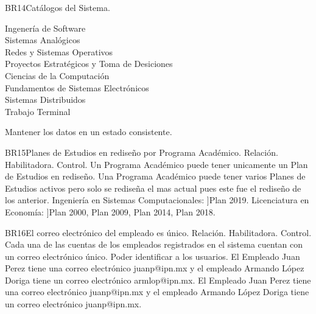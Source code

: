 \begin{BussinesRule}{BR14}{Catálogos del Sistema.}
\begin{itemize}
            Ingenería de Software\\
            Sistemas Analógicos\\
            Redes y Sistemas Operativos\\
            Proyectos Estratégicos y Toma de Desiciones\\
            Ciencias de la Computación\\
            Fundamentos de Sistemas Electrónicos\\
            Sistemas Distribuidos\\
            Trabajo Terminal
    \end{itemize}
    \BRitem[Motivación: ]Mantener los datos en un estado consistente.
\end{BussinesRule}
\begin{BussinesRule}{BR15}{Planes de Estudios en rediseño por Programa Académico.}
    \BRitem[Tipo:] Relación.
    \BRitem[Clase:] Habilitadora.
    \BRitem[Nivel:] Control.
    \BRitem[Descripción:] Un Programa Académico puede tener unicamente un Plan de Estudios en rediseño.
    \BRitem[Motivación: ]Una Programa Académico puede tener varios Planes de Estudios activos pero solo se rediseña el mas actual pues este fue el rediseño de los anterior.
     Ingeniería en Sistemas Computacionales: ]Plan 2019.
     Licenciatura en Economía: ]Plan 2000, Plan 2009, Plan 2014, Plan 2018.
\end{BussinesRule}
\begin{BussinesRule}{BR16}{El correo electrónico del empleado es único.}
    \BRitem[Tipo: ]Relación.
    \BRitem[Clase: ]Habilitadora.
    \BRitem[Nivel: ]Control.
    \BRitem[Descripción:] Cada una de las cuentas de los empleados registrados en el sistema cuentan con un correo electrónico único.
    \BRitem[Motivación: ]Poder identificar a los usuarios.
     El Empleado Juan Perez tiene una correo electrónico juanp@ipn.mx  y el empleado Armando López Doriga tiene un correo electrónico armlop@ipn.mx.
     El Empleado Juan Perez tiene una correo electrónico juanp@ipn.mx  y el empleado Armando López Doriga tiene un correo electrónico juanp@ipn.mx.
\end{BussinesRule}
